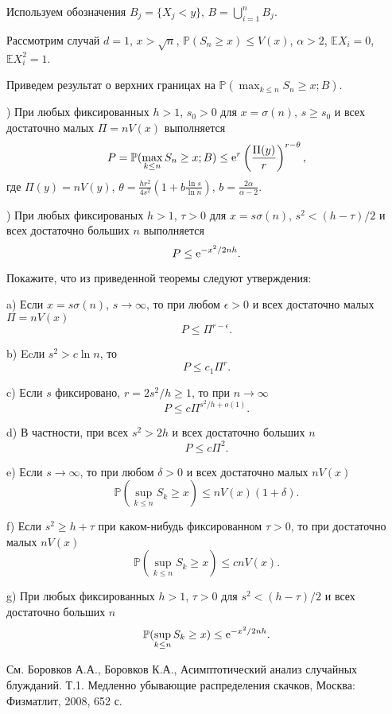 \begin{remark}
Используем обозначения $B_j = \{X_j<y\}$, $B = \bigcup_{i=1}^n B_j$.

Рассмотрим случай $d=1$, $x>\sqrt{n}$, $\mathbb{P}(S_n\geq x) \leq V(x)$, $\alpha>2$, $\mathbb{E}X_i = 0$, $\mathbb{E} X_i^2 = 1$. 

Приведем результат о верхних границах на $\mathbb{P}(\max_{k\leq n} S_n \geq x; B)$.

)  При любых фиксированных $h>1$, $s_0>0$ для $x = \sigma(n)$, $s\geq s_0$ и всех достаточно малых $\Pi = nV(x)$ выполняется 
\[
P = \mathbb{P}(\max_{k\leq n} S_n \geq x; B)\leq {\rm e}^{r} \left(\frac{\Pi(y)}{r}\right)^{r-\theta},
\]
где $\Pi(y)= nV(y)$, $\theta = \frac{hr^2}{4s^2}\left(1+b\frac{\ln s}{\ln n}\right)$, $b = \frac{2\alpha}{\alpha-2}$.

) При любых фиксированых $h>1$, $\tau>0$ для $x = s\sigma(n)$, $s^2<(h-\tau)/2$ и всех достаточно больших $n$ выполняется
\[
P\leq{\rm e}^{-x^2/2nh}.
\]

Покажите, что из приведенной теоремы следуют утверждения:

\noindent a) Если $x=s\sigma(n)$, $s\to\infty$, то при любом $\epsilon>0$ и всех достаточно малых $\Pi=nV(x)$
\[
P\leq \Pi^{r-\epsilon}.
\]

\noindent b) Ecли $s^2>c\ln n$, то 
\[
P\leq c_1\Pi^{r}.
\]

\noindent c) Если $s$ фиксировано, $r = 2s^2/h\geq 1$, то при $n \to\infty$
\[
P\leq c\Pi^{s^2/h+{o}(1)}.
\]

\noindent d) В частности, при всех $s^2>2h$ и всех достаточно больших $n$
\[
P\leq c\Pi^2.
\]

\noindent e) Если $s\to\infty$, то при любом $\delta>0$ и всех достаточно малых $nV(x)$
\[
\mathbb{P}(\sup_{k\leq n}S_k\geq x)\leq nV(x)(1+\delta).
\]

\noindent f)
Если $s^2\geq h+\tau$ при каком-нибудь фиксированном $\tau>0$, то при достаточно малых $nV(x)$
\[
\mathbb{P}(\sup_{k\leq n}S_k\geq x)\leq cnV(x).
\]

\noindent g) При любых фиксированных $h>1$, $\tau>0$ для $s^2<(h-\tau)/2$ и всех достаточно больших $n$
\[
\mathbb{P}(\sup_{k\leq n}S_k\geq x)\leq {\rm e}^{-x^2/2nh}.
\]

См. Боровков А.А., Боровков К.А., Асимптотический анализ случайных блужданий.  Т.1. Медленно убывающие распределения скачков, Москва: Физматлит, 2008, 652 с.
\end{remark}



